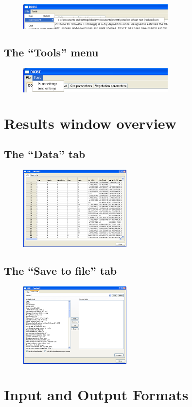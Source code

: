 \documentclass[10pt,a4paper]{article}
\begin{document}
\begin{figure}[H]
\centering
\includegraphics[width=0.7\textwidth]{images/ss/file-menu-cropped}
\end{figure}


\subsection{The ``Tools'' menu}

\begin{figure}[H]
\centering
\includegraphics[width=0.7\textwidth]{images/ss/tools-menu-cropped}
\end{figure}



\section{Results window overview}

\subsection{The ``Data'' tab}

\begin{figure}[H]
\centering
\includegraphics[width=0.5\textwidth]{images/ss/results-grid}
\end{figure}


\subsection{The ``Save to file'' tab}

\begin{figure}[H]
\centering
\includegraphics[width=0.5\textwidth]{images/ss/results-save}
\end{figure}



\section{Input and Output Formats}
\label{sec:io-formats}
\end{document}
